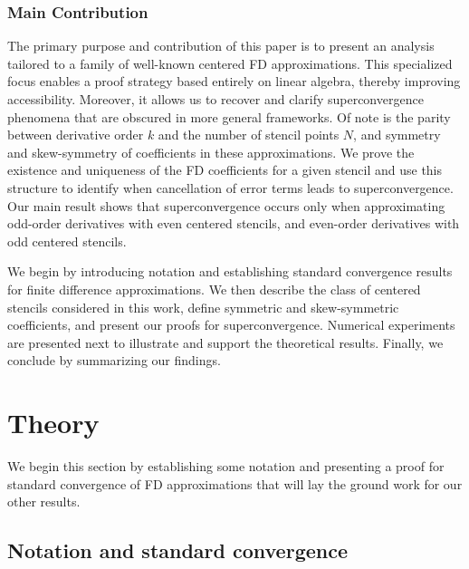 \documentclass[12pt]{article}
\begin{document}
\subsubsection*{Main Contribution} 
The primary purpose and contribution of this paper is to present an analysis tailored to a family of well-known centered FD approximations.
This specialized focus enables a proof strategy based entirely on linear algebra, thereby improving accessibility.
Moreover, it allows us to recover and clarify superconvergence phenomena that are obscured in more general frameworks.
Of note is the parity between derivative order $k$ and the number of stencil points $N$, and symmetry and skew-symmetry of coefficients in these approximations.
We prove the existence and uniqueness of the FD coefficients for a given stencil and use this structure to identify when cancellation of error terms leads to superconvergence.
Our main result shows that superconvergence occurs only when approximating odd-order derivatives with even centered stencils, and even-order derivatives with odd centered stencils. 

We begin by introducing notation and establishing standard convergence results for finite difference approximations.
We then describe the class of centered stencils considered in this work, define symmetric and skew-symmetric coefficients, and present our proofs for superconvergence.
Numerical experiments are presented next to illustrate and support the theoretical results.
Finally, we conclude by summarizing our findings.

\section{Theory} \label{sec: theory}
\label{sec:main}

We begin this section by establishing some notation and presenting a proof for standard convergence of FD approximations that will lay the ground work for our other results.

\subsection{Notation and standard convergence}
\end{document}
